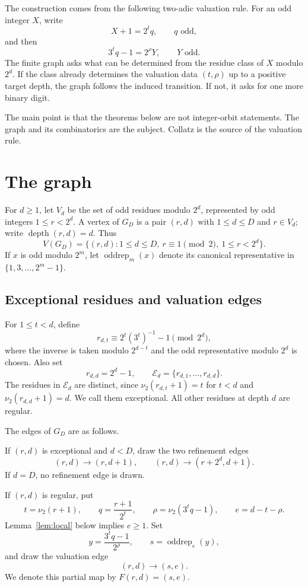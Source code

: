 \documentclass[11pt]{article}
\theoremstyle{definition}
\theoremstyle{remark}
\newcommand{\nuu}{\nu_2}
\newcommand{\Ecal}{\mathcal E}
\newcommand{\depth}{\operatorname{depth}}
\newcommand{\oddrep}{\operatorname{oddrep}}
\begin{document}
The construction comes from the following two-adic valuation rule.  For an odd integer $X$, write
\[
X+1=2^tq,\qquad q\text{ odd},
\]
and then
\[
3^tq-1=2^\rho Y,\qquad Y\text{ odd}.
\]
The finite graph asks what can be determined from the residue class of $X$ modulo $2^d$.  If the class already determines the valuation data $(t,\rho)$ up to a positive target depth, the graph follows the induced transition.  If not, it asks for one more binary digit.

The main point is that the theorems below are not integer-orbit statements.  The graph and its combinatorics are the subject.  Collatz is the source of the valuation rule.

\section{The graph}\label{sec:graph}

For $d\ge1$, let $V_d$ be the set of odd residues modulo $2^d$, represented by odd integers $1\le r<2^d$.  A vertex of $G_D$ is a pair $(r,d)$ with $1\le d\le D$ and $r\in V_d$; write $\depth(r,d)=d$.  Thus
\[
V(G_D)=\{(r,d):1\le d\le D,\ r\equiv1\pmod2,\ 1\le r<2^d\}.
\]
If $x$ is odd modulo $2^m$, let $\oddrep_m(x)$ denote its canonical representative in $\{1,3,\ldots,2^m-1\}$.

\subsection{Exceptional residues and valuation edges}

For $1\le t<d$, define
\[
r_{d,t}\equiv 2^t(3^t)^{-1}-1\pmod {2^d},
\]
where the inverse is taken modulo $2^{d-t}$ and the odd representative modulo $2^d$ is chosen.  Also set
\[
r_{d,d}=2^d-1,
\qquad
\Ecal_d=\{r_{d,1},\ldots,r_{d,d}\}.
\]
The residues in $\Ecal_d$ are distinct, since $\nuu(r_{d,t}+1)=t$ for $t<d$ and $\nuu(r_{d,d}+1)=d$.  We call them exceptional.  All other residues at depth $d$ are regular.

The edges of $G_D$ are as follows.

If $(r,d)$ is exceptional and $d<D$, draw the two refinement edges
\[
(r,d)\to(r,d+1),\qquad (r,d)\to(r+2^d,d+1).
\]
If $d=D$, no refinement edge is drawn.

If $(r,d)$ is regular, put
\[
t=\nuu(r+1),\qquad q=\frac{r+1}{2^t},\qquad
\rho=\nuu(3^tq-1),\qquad e=d-t-\rho.
\]
Lemma~\ref{lem:local} below implies $e\ge1$.  Set
\[
y=\frac{3^tq-1}{2^\rho},\qquad s=\oddrep_e(y),
\]
and draw the valuation edge
\[
(r,d)\to(s,e).
\]
We denote this partial map by $F(r,d)=(s,e)$.
\end{document}

